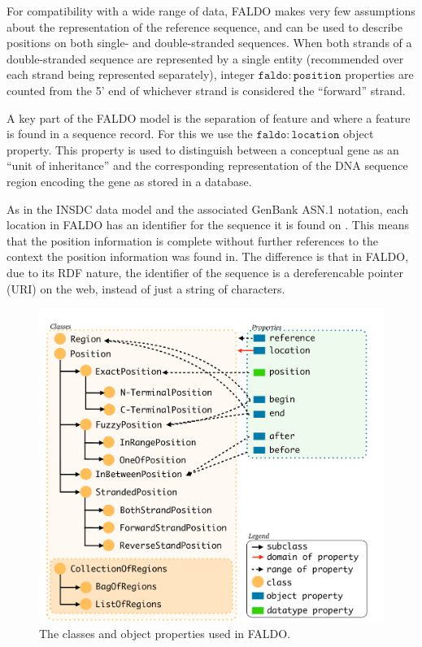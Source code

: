 For compatibility with a wide range of data, FALDO makes very few
assumptions about the representation of the reference sequence, and
can be used to describe positions on both single- and double-stranded
sequences.
When both strands of a double-stranded sequence are represented by a
single entity (recommended over each strand being represented
separately), integer $\mathtt{faldo\colon{}position}$ properties are
counted from the 5' end of whichever strand is considered the
``forward'' strand.

A key part of the FALDO model is the separation of feature and where a feature is found in a sequence record.
For this we use the $\mathtt{faldo\colon{}location}$ object property. 
This property is used to distinguish between a conceptual gene as an ``unit of inheritance'' and the corresponding representation of the DNA sequence region encoding the gene as stored in a database.

As in the INSDC data model and the associated GenBank ASN.1 notation,
each location in FALDO has an identifier for the sequence it is found on \cite{NCBI}.
This means that the position information is complete without further references to the context the position information was found in.
The difference is that in FALDO, due to its RDF nature, the identifier of the sequence is a dereferencable pointer (URI) on the web, instead of just a string of characters.


\begin{figure}
\begin{center}
\includegraphics[width=17cm]{figures/ClassDiagram.pdf}
\end{center}
\caption{The classes and object properties used in FALDO.}
\label{fig:ontology}
\end{figure}


